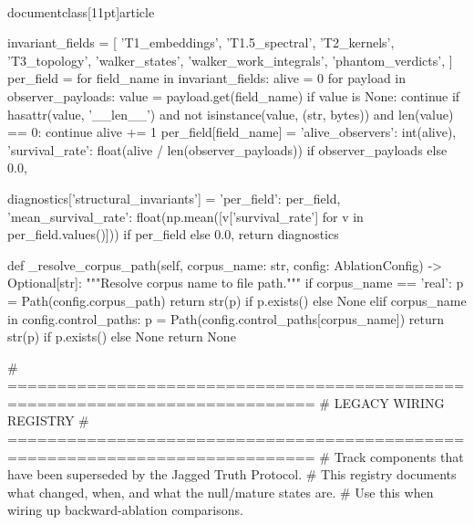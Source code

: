 \\documentclass[11pt]{article}
\begin{document}
\begin{CodeBlock}
        invariant_fields = [
            'T1_embeddings',
            'T1.5_spectral',
            'T2_kernels',
            'T3_topology',
            'walker_states',
            'walker_work_integrals',
            'phantom_verdicts',
        ]
        per_field = {}
        for field_name in invariant_fields:
            alive = 0
            for payload in observer_payloads:
                value = payload.get(field_name)
                if value is None:
                    continue
                if hasattr(value, '__len__') and not isinstance(value, (str, bytes)) and len(value) == 0:
                    continue
                alive += 1
            per_field[field_name] = {
                'alive_observers': int(alive),
                'survival_rate': float(alive / len(observer_payloads)) if observer_payloads else 0.0,
            }

        diagnostics['structural_invariants'] = {
            'per_field': per_field,
            'mean_survival_rate': float(np.mean([v['survival_rate'] for v in per_field.values()])) if per_field else 0.0,
        }
        return diagnostics

    def _resolve_corpus_path(self, corpus_name: str, config: AblationConfig) -> Optional[str]:
        """Resolve corpus name to file path."""
        if corpus_name == 'real':
            p = Path(config.corpus_path)
            return str(p) if p.exists() else None
        elif corpus_name in config.control_paths:
            p = Path(config.control_paths[corpus_name])
            return str(p) if p.exists() else None
        return None


# =============================================================================
# LEGACY WIRING REGISTRY
# =============================================================================
# Track components that have been superseded by the Jagged Truth Protocol.
# This registry documents what changed, when, and what the null/mature states are.
# Use this when wiring up backward-ablation comparisons.


\end{CodeBlock}
\end{document}
